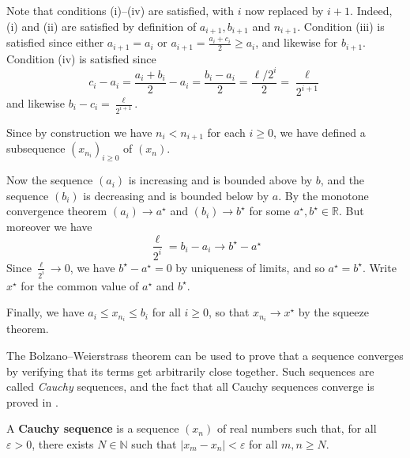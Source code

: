 \begin{cproof}
Note that conditions (i)--(iv) are satisfied, with $i$ now replaced by $i+1$. Indeed, (i) and (ii) are satisfied by definition of $a_{i+1}, b_{i+1}$ and $n_{i+1}$. Condition (iii) is satisfied since either $a_{i+1}=a_i$ or $a_{i+1} = \frac{a_i + c_i}{2} \ge a_i$, and likewise for $b_{i+1}$. Condition (iv) is satisfied since
\[ c_i-a_i = \frac{a_i+b_i}{2} - a_i = \frac{b_i-a_i}{2} = \frac{\ell/2^i}{2} = \frac{\ell}{2^{i+1}} \]
and likewise $b_i-c_i = \frac{\ell}{2^{i+1}}$.

Since by construction we have $n_i<n_{i+1}$ for each $i \ge 0$, we have defined a subsequence $(x_{n_i})_{i \ge 0}$ of $(x_n)$.

Now the sequence $(a_i)$ is increasing and is bounded above by $b$, and the sequence $(b_i)$ is decreasing and is bounded below by $a$. By the monotone convergence theorem $(a_i) \to a^{\star}$ and $(b_i) \to b^{\star}$ for some $a^{\star}, b^{\star} \in \mathbb{R}$. But moreover we have
\[ \frac{\ell}{2^i} = b_i - a_i \to b^{\star} - a^{\star} \]
Since $\frac{\ell}{2^i} \to 0$, we have $b^{\star} - a^{\star} = 0$ by uniqueness of limits, and so $a^{\star} = b^{\star}$. Write $x^{\star}$ for the common value of $a^{\star}$ and $b^{\star}$.

Finally, we have $a_i \le x_{n_i} \le b_i$ for all $i \ge 0$, so that $x_{n_i} \to x^{\star}$ by the squeeze theorem.
\end{cproof}

The Bolzano--Weierstrass theorem can be used to prove that a sequence converges by verifying that its terms get arbitrarily close together. Such sequences are called \textit{Cauchy} sequences, and the fact that all Cauchy sequences converge is proved in .

\begin{definition}
\label{defCauchySequence}
A \textbf{Cauchy sequence} is a sequence $(x_n)$ of real numbers such that, for all $\varepsilon > 0$, there exists $N \in \mathbb{N}$ such that $|x_m-x_n| < \varepsilon$ for all $m,n \ge N$.
\end{definition}

